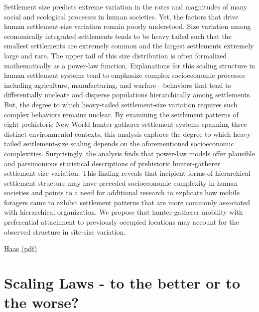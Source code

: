 \documentclass[
]{book}
\begin{document}
Settlement size predicts extreme variation in the rates and magnitudes of many social and ecological processes in human societies. Yet, the factors that drive human settlement-size variation remain poorly understood. Size variation among economically integrated settlements tends to be heavy tailed such that the smallest settlements are extremely common and the largest settlements extremely large and rare. The upper tail of this size distribution is often formalized mathematically as a power-law function. Explanations for this scaling structure in human settlement systems tend to emphasize complex socioeconomic processes including agriculture, manufacturing, and warfare---behaviors that tend to differentially nucleate and disperse populations hierarchically among settlements. But, the degree to which heavy-tailed settlement-size variation requires such complex behaviors remains unclear. By examining the settlement patterns of eight prehistoric New World hunter-gatherer settlement systems spanning three distinct environmental contexts, this analysis explores the degree to which heavy-tailed settlement-size scaling depends on the aforementioned socioeconomic complexities. Surprisingly, the analysis finds that power-law models offer plausible and parsimonious statistical descriptions of prehistoric hunter-gatherer settlement-size variation. This finding reveals that incipient forms of hierarchical settlement structure may have preceded socioeconomic complexity in human societies and points to a need for additional research to explicate how mobile foragers came to exhibit settlement patterns that are more commonly associated with hierarchical organization. We propose that hunter-gatherer mobility with preferential attachment to previously occupied locations may account for the observed structure in site-size variation.

\href{https://journals.plos.org/plosone/article?id=10.1371/journal.pone.0140127}{Haas}
\href{pdf/Haas_2015_Prehistoric_Settlement_Size_Scaling.pdf}{(pdf)}

\hypertarget{scaling-laws---to-the-better-or-to-the-worse}{%
\section{Scaling Laws - to the better or to the worse?}\label{scaling-laws---to-the-better-or-to-the-worse}}
\end{document}

